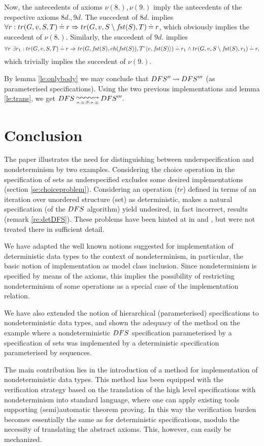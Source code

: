 Now, the antecedents of axioms $\nu(8.),\nu(9.)$ imply the antecedents of the respective axioms $8d.,9d.$
The succedent of $8d.$ implies $\forall r: tr(G,v,S,T)\mathbin{\doteq} r\mathrel\Rightarrow tr(G,v,S\setminus f\!st(S),T)\mathbin{\doteq} r$, which obviously implies the succedent of $\nu(8.).$ Similarly, the succedent of $9d.$ implies $$\forall r\ \exists r_1: tr(G,v,S,T)\mathbin{\doteq} r\mathrel\Rightarrow tr(G,f\!st(S),ch(f\!st(S)),T\hat{\ }\langle v,f\!st(S)\rangle) \mathbin{\doteq} r_1\land tr(G,v,S\setminus f\!st(S),r_1)\mathbin{\doteq} r,$$ which trivially implies the succedent of $\nu(9.).$

By lemma \ref{le:onlybody} we may conclude that $DFS''\mathbin{\leadsto} DFS'''$ (as parameterised specifications). Using the two previous implementations and lemma \ref{le:trans}, we get $\DFS\impd{}{\sigma,\equiv;\overline\sigma;\sigma,\equiv}\DFS'''.$ 

\section{Conclusion}\label{se:conclusion} 
The paper illustrates the need for
distinguishing between underspecification and nondeterminism by two
examples. Considering the choice operation in the specification of sets as
underspecified excludes some desired implementations (section \ref{se:choiceproblem}).
Considering an operation ($tr$) defined in terms of an iteration over
unordered structure (set) as deterministic, makes a natural specification (of
the $DFS$ algorithm) yield undesired, in fact incorrect, results (remark
\ref{re:detDFS}).
These problems have been hinted at in \cite{QG} and \cite{adt}, but were not
treated there in sufficient detail.

We have adapted the well known notions suggested for implementation of deterministic
data types to the context of nondeterminism, in particular, the basic notion of implementation as model class inclusion. Since nondeterminism is specified by means of the axioms, this implies the possibility of restricting nondeterminism of some operations as a special case of the implementation relation.

We have also extended the notion of hierarchical (parameterised) specifications to 
nondeterministic data types, and shown the adequacy of the method on the example where a nondeterministic $DFS$ specification parameterised by a specification of sets was implemented by a deterministic specification parameterised by sequences. 

The main contribution lies in the introduction of a method for implementation of nondeterministic data types. This method has been equipped with the verification strategy based on the translation of the high level specifications
with nondeterminism into standard language, where one can apply existing tools
supporting (semi)automatic theorem proving. In this way the verification burden becomes essentially the same as for deterministic specifications, modulo the 
necessity of translating the abstract axioms. 
This, however, can easily be mechanized. 

